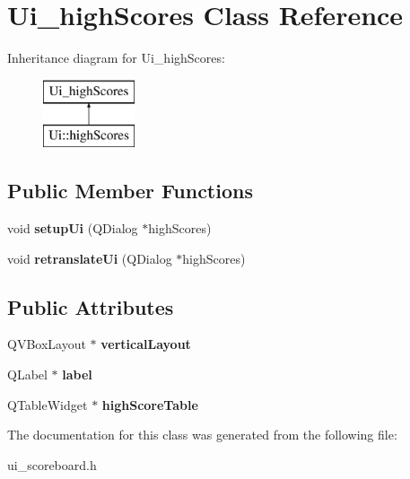 \hypertarget{classUi__highScores}{\section{Ui\-\_\-high\-Scores Class Reference}
\label{classUi__highScores}
}
Inheritance diagram for Ui\-\_\-high\-Scores\-:\begin{figure}[H]
\begin{center}
\leavevmode
\includegraphics[height=2.000000cm]{classUi__highScores}
\end{center}
\end{figure}
\subsection*{Public Member Functions}
\begin{DoxyCompactItemize}
\item 
\hypertarget{classUi__highScores_a7789223a709e203477cb67b8d31b3d09}{void {\bfseries setup\-Ui} (Q\-Dialog $\ast$high\-Scores)}\label{classUi__highScores_a7789223a709e203477cb67b8d31b3d09}

\item 
\hypertarget{classUi__highScores_a318dbf59c03174ab36720fd547068864}{void {\bfseries retranslate\-Ui} (Q\-Dialog $\ast$high\-Scores)}\label{classUi__highScores_a318dbf59c03174ab36720fd547068864}

\end{DoxyCompactItemize}
\subsection*{Public Attributes}
\begin{DoxyCompactItemize}
\item 
\hypertarget{classUi__highScores_a54161485451a5ad1ced172052cb5d3a7}{Q\-V\-Box\-Layout $\ast$ {\bfseries vertical\-Layout}}\label{classUi__highScores_a54161485451a5ad1ced172052cb5d3a7}

\item 
\hypertarget{classUi__highScores_a2b10fee61ea84d2f71d41616e503ca9f}{Q\-Label $\ast$ {\bfseries label}}\label{classUi__highScores_a2b10fee61ea84d2f71d41616e503ca9f}

\item 
\hypertarget{classUi__highScores_adfeb2ab1e65bb13cbcda691bcef8272a}{Q\-Table\-Widget $\ast$ {\bfseries high\-Score\-Table}}\label{classUi__highScores_adfeb2ab1e65bb13cbcda691bcef8272a}

\end{DoxyCompactItemize}


The documentation for this class was generated from the following file\-:\begin{DoxyCompactItemize}
\item 
ui\-\_\-scoreboard.\-h\end{DoxyCompactItemize}
